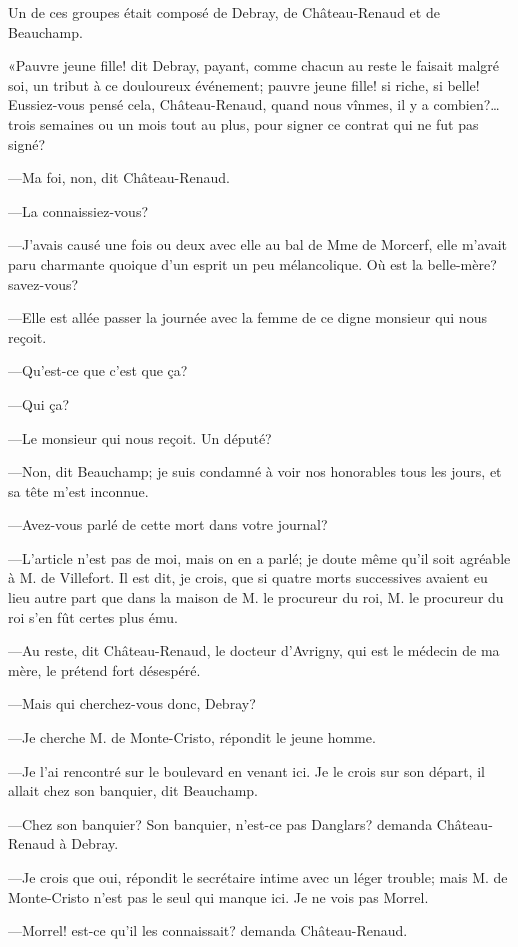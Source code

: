 Un de ces groupes était composé de Debray, de Château-Renaud et de Beauchamp. 

«Pauvre jeune fille! dit Debray, payant, comme chacun au reste le faisait malgré soi, un tribut à ce douloureux événement; pauvre jeune fille! si riche, si belle! Eussiez-vous pensé cela, Château-Renaud, quand nous vînmes, il y a combien?\dots trois semaines ou un mois tout au plus, pour signer ce contrat qui ne fut pas signé? 

—Ma foi, non, dit Château-Renaud. 

—La connaissiez-vous? 

—J'avais causé une fois ou deux avec elle au bal de Mme de Morcerf, elle m'avait paru charmante quoique d'un esprit un peu mélancolique. Où est la belle-mère? savez-vous? 

—Elle est allée passer la journée avec la femme de ce digne monsieur qui nous reçoit. 

—Qu'est-ce que c'est que ça? 

—Qui ça? 

—Le monsieur qui nous reçoit. Un député? 

—Non, dit Beauchamp; je suis condamné à voir nos honorables tous les jours, et sa tête m'est inconnue. 

—Avez-vous parlé de cette mort dans votre journal? 

—L'article n'est pas de moi, mais on en a parlé; je doute même qu'il soit agréable à M. de Villefort. Il est dit, je crois, que si quatre morts successives avaient eu lieu autre part que dans la maison de M. le procureur du roi, M. le procureur du roi s'en fût certes plus ému. 

—Au reste, dit Château-Renaud, le docteur d'Avrigny, qui est le médecin de ma mère, le prétend fort désespéré. 

—Mais qui cherchez-vous donc, Debray? 

—Je cherche M. de Monte-Cristo, répondit le jeune homme. 

—Je l'ai rencontré sur le boulevard en venant ici. Je le crois sur son départ, il allait chez son banquier, dit Beauchamp. 

—Chez son banquier? Son banquier, n'est-ce pas Danglars? demanda Château-Renaud à Debray. 

—Je crois que oui, répondit le secrétaire intime avec un léger trouble; mais M. de Monte-Cristo n'est pas le seul qui manque ici. Je ne vois pas Morrel. 

—Morrel! est-ce qu'il les connaissait? demanda Château-Renaud. 

